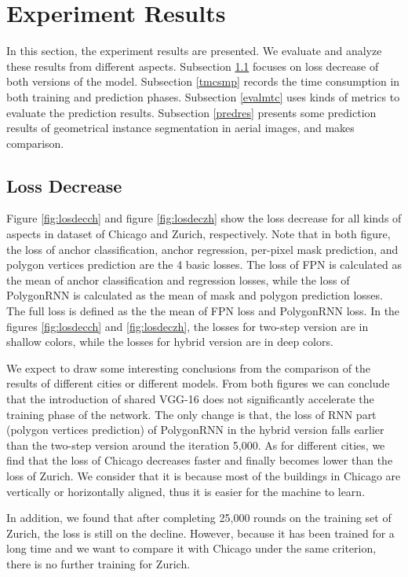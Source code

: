 \section{Experiment Results}\label{expres}
In this section, the experiment results are presented. We evaluate and analyze these results from different aspects. Subsection \ref{lossdec} focuses on loss decrease of both versions of the model. Subsection \ref{tmcsmp} records the time consumption in both training and prediction phases. Subsection \ref{evalmtc} uses kinds of metrics to evaluate the prediction results. Subsection \ref{predres} presents some prediction results of geometrical instance segmentation in aerial images, and makes comparison.

\subsection{Loss Decrease}\label{lossdec}
Figure \ref{fig:losdecch} and figure \ref{fig:losdeczh} show the loss decrease for all kinds of aspects in dataset of Chicago and Zurich, respectively. Note that in both figure, the loss of anchor classification, anchor regression, per-pixel mask prediction, and polygon vertices prediction are the 4 basic losses. The loss of FPN is calculated as the mean of anchor classification and regression losses, while the loss of PolygonRNN is calculated as the mean of mask and polygon prediction losses. The full loss is defined as the the mean of FPN loss and PolygonRNN loss. In the figures \ref{fig:losdecch} and \ref{fig:losdeczh}, the losses for two-step version are in shallow colors, while the losses for hybrid version are in deep colors.

We expect to draw some interesting conclusions from the comparison of the results of different cities or different models. From both figures we can conclude that the introduction of shared VGG-16 does not significantly accelerate the training phase of the network. The only change is that, the loss of RNN part (polygon vertices prediction) of PolygonRNN in the hybrid version falls earlier than the two-step version around the iteration 5,000. As for different cities, we find that the loss of Chicago decreases faster and finally becomes lower than the loss of Zurich. We consider that it is because most of the buildings in Chicago are vertically or horizontally aligned, thus it is easier for the machine to learn.




In addition, we found that after completing 25,000 rounds on the training set of Zurich, the loss is still on the decline. However, because it has been trained for a long time and we want to compare it with Chicago under the same criterion, there is no further training for Zurich.

